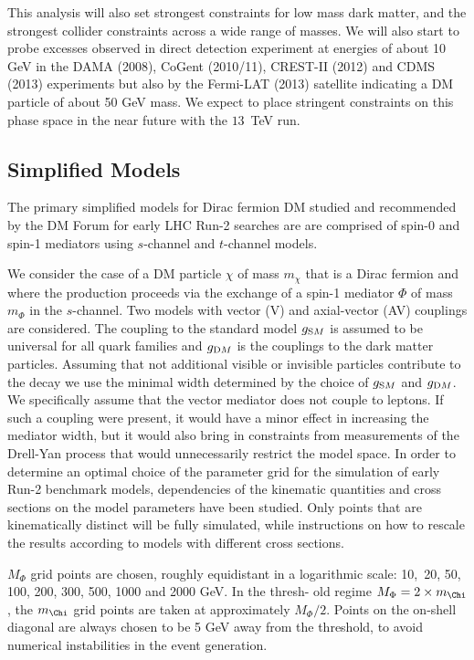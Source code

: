 This analysis will also set strongest constraints for low mass dark matter, and the strongest collider constraints across a wide range of masses. We will also start to probe excesses observed in direct detection experiment at energies of about 10 GeV in the DAMA (2008), CoGent (2010/11), CREST-II (2012) and CDMS (2013) experiments but also by the Fermi-LAT (2013) satellite indicating a DM particle of about 50 GeV mass. We expect to place stringent constraints on this phase space in the near future with the $13$~TeV run.




\subsection{Simplified Models}


The primary simplified models for Dirac fermion DM studied and recommended by the DM Forum for early LHC Run-2 searches are
are comprised of spin-0 and spin-1 mediators using $s$-channel and $t$-channel models.


We consider the case of a DM particle $\chi$ of mass $m_{\chi}$ that is a Dirac fermion and where the production proceeds via the exchange
of a spin-1 mediator $\Phi$ of mass $m_{\Phi}$ in the $s$-channel. Two models with vector (V) and axial-vector (AV) couplings are considered. The coupling to the standard model
$g_{\textrm SM}$ is assumed to be universal for all quark families and $g_{\textrm DM}$ is the couplings to the dark matter particles. Assuming that not additional visible or invisible particles contribute to the decay we use the minimal width determined by the choice of $g_{\textrm SM}$ and $g_{\textrm DM}$.
We specifically assume that the vector mediator does not couple to leptons. If such a coupling were present, it would have a minor effect in increasing the mediator width, but it
would also bring in constraints from measurements of the Drell-Yan process that would unnecessarily restrict the model space. 
 In order to determine an optimal choice of the parameter grid for the simulation of early Run-2 benchmark models, dependencies of the kinematic quantities and cross sections on the model parameters
have been studied. Only points that are kinematically distinct will be fully simulated, while instructions on how to rescale the results
according to models with different cross sections. 


$M_{\Phi}$ grid points are chosen, roughly equidistant in a logarithmic scale: 10,~20, 50, 100, 200, 300, 500, 1000 and 2000 GeV. In the thresh-
old regime $M_{\Phi} = 2 \times m_{\Chi}$, the $ m_{\Chi}$ grid points are taken at approximately $M_{\Phi}/2$. Points on the on-shell diagonal are always chosen to be
5 GeV away from the threshold, to avoid numerical instabilities in the event generation. 


